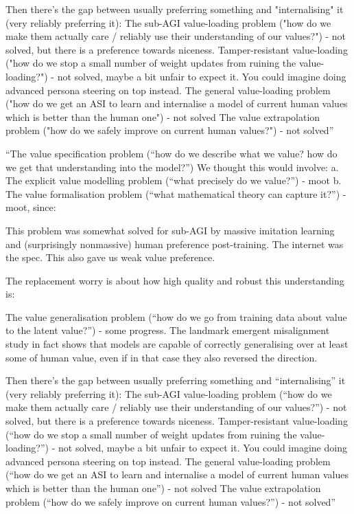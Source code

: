 \documentclass[11pt]{article}
\begin{document}
Then there's the gap between usually preferring something and "internalising" it (very reliably preferring it):
The sub-AGI value-loading problem ("how do we make them actually care / reliably use their understanding of our values?") - not solved, but there is a preference towards niceness.
Tamper-resistant value-loading ("how do we stop a small number of weight updates from ruining the value-loading?") - not solved, maybe a bit unfair to expect it. You could imagine doing advanced persona steering on top instead.
The general value-loading problem ("how do we get an ASI to learn and internalise a model of current human values which is better than the human one") - not solved
The value extrapolation problem ("how do we safely improve on current human values?") - not solved''

``The value specification problem (“how do we describe what we value? how do we get that understanding into the model?”)
We thought this would involve:
a. The explicit value modelling problem (“what precisely do we value?”) - moot
b. The value formalisation problem (“what mathematical theory can capture it?”) - moot, since:

This problem was somewhat solved for sub-AGI by massive imitation learning and (surprisingly nonmassive) human preference post-training. The internet was the spec. This also gave us weak value preference.

The replacement worry is about how high quality and robust this understanding is:

The value generalisation problem (“how do we go from training data about value to the latent value?”) - some progress. The landmark emergent misalignment study in fact shows that models are capable of correctly generalising over at least some of human value, even if in that case they also reversed the direction. 

Then there’s the gap between usually preferring something and “internalising” it (very reliably preferring it):
The sub-AGI value-loading problem (“how do we make them actually care / reliably use their understanding of our values?”) - not solved, but there is a preference towards niceness.
Tamper-resistant value-loading (“how do we stop a small number of weight updates from ruining the value-loading?”) - not solved, maybe a bit unfair to expect it. You could imagine doing advanced persona steering on top instead.
The general value-loading problem (“how do we get an ASI to learn and internalise a model of current human values which is better than the human one”) - not solved
The value extrapolation problem (“how do we safely improve on current human values?”) - not solved''
\end{document}
